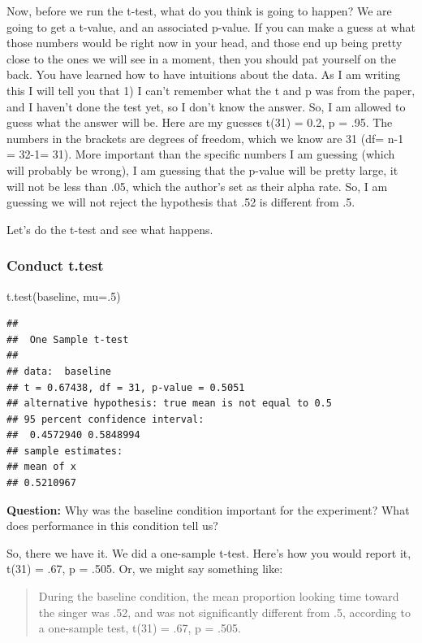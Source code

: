 \documentclass[
]{book}
\newenvironment{Shaded}{\begin{snugshade}}{\end{snugshade}}
\newcommand{\AttributeTok}[1]{\textcolor[rgb]{0.77,0.63,0.00}{#1}}
\newcommand{\DecValTok}[1]{\textcolor[rgb]{0.00,0.00,0.81}{#1}}
\newcommand{\FunctionTok}[1]{\textcolor[rgb]{0.00,0.00,0.00}{#1}}
\newcommand{\NormalTok}[1]{#1}
\begin{document}
Now, before we run the t-test, what do you think is going to happen? We are going to get a t-value, and an associated p-value. If you can make a guess at what those numbers would be right now in your head, and those end up being pretty close to the ones we will see in a moment, then you should pat yourself on the back. You have learned how to have intuitions about the data. As I am writing this I will tell you that 1) I can't remember what the t and p was from the paper, and I haven't done the test yet, so I don't know the answer. So, I am allowed to guess what the answer will be. Here are my guesses t(31) = 0.2, p = .95. The numbers in the brackets are degrees of freedom, which we know are 31 (df= n-1 = 32-1= 31). More important than the specific numbers I am guessing (which will probably be wrong), I am guessing that the p-value will be pretty large, it will not be less than .05, which the author's set as their alpha rate. So, I am guessing we will not reject the hypothesis that .52 is different from .5.

Let's do the t-test and see what happens.

\hypertarget{conduct-t.test}{%
\subsubsection{Conduct t.test}\label{conduct-t.test}}

\begin{Shaded}
\begin{Highlighting}[]
\FunctionTok{t.test}\NormalTok{(baseline, }\AttributeTok{mu=}\NormalTok{.}\DecValTok{5}\NormalTok{)}
\end{Highlighting}
\end{Shaded}

\begin{verbatim}
## 
##  One Sample t-test
## 
## data:  baseline
## t = 0.67438, df = 31, p-value = 0.5051
## alternative hypothesis: true mean is not equal to 0.5
## 95 percent confidence interval:
##  0.4572940 0.5848994
## sample estimates:
## mean of x 
## 0.5210967
\end{verbatim}

\textbf{Question:} Why was the baseline condition important for the experiment? What does performance in this condition tell us?

So, there we have it. We did a one-sample t-test. Here's how you would report it, t(31) = .67, p = .505. Or, we might say something like:

\begin{quote}
During the baseline condition, the mean proportion looking time toward the singer was .52, and was not significantly different from .5, according to a one-sample test, t(31) = .67, p = .505.
\end{quote}
\end{document}
